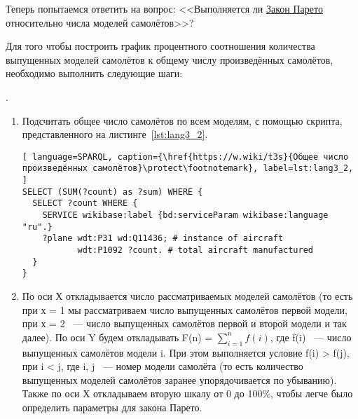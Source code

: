 
\newpage 
{}
Теперь попытаемся ответить на вопрос: <<Выполняется ли \href{https://clck.ru/JvaaU}{Закон Парето} относительно числа моделей самолётов>>?

Для того чтобы построить график процентного соотношения количества выпущенных моделей самолётов к общему числу произведённых самолётов, необходимо выполнить следующие шаги:

.

\begin{enumerate} 
  \item Подсчитать общее число самолётов по всем моделям, с помощью скрипта, представленного на листинге~\ref{lst:lang3_2}.
  
\begin{lstlisting}[ language=SPARQL, caption={\href{https://w.wiki/t3s}{Общее число произведённых самолётов}\protect\footnotemark}, label=lst:lang3_2, ]
SELECT (SUM(?count) as ?sum) WHERE {
  SELECT ?count WHERE {
    SERVICE wikibase:label {bd:serviceParam wikibase:language "ru".}
    ?plane wdt:P31 wd:Q11436; # instance of aircraft
		   wdt:P1092 ?count. # total aircraft manufactured
  }
}
\end{lstlisting}
  
  
  \item По оси Х откладывается число рассматриваемых моделей самолётов (то есть при х = 1 мы рассматриваем число выпущенных самолётов первой модели, при х = 2 ~--- число выпущенных самолётов первой и второй модели и так далее). По оси Y будем откладывать F(n) = $\sum\limits_{i=1}^n f(i)$, где f(i) ~--- число выпущенных самолётов модели i. При этом выполняется условие f(i) > f(j), при i < j, где i, j ~--- номер модели самолёта (то есть количество выпущенных моделей самолётов заранее упорядочивается по убыванию). Также по оси Х откладываем вторую шкалу от 0 до 100\%, чтобы легче было определить параметры для закона Парето.
\end{enumerate}

